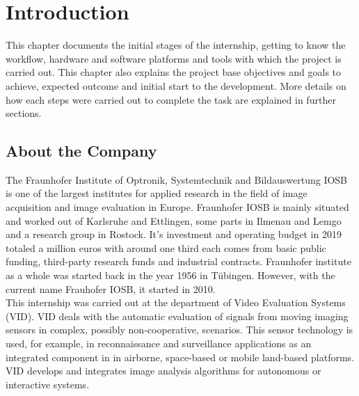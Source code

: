 \chapter{Introduction}
\label{ch:intro}
This chapter documents the initial stages of the internship, getting to know the workflow, hardware and software platforms and tools with which the project is carried out. This chapter also explains the project base objectives and goals to achieve, expected outcome and initial start to the development. More details on how each steps were carried out to complete the task are explained in further sections.

%
%
\section{About the Company}
\label{sec:intro:aboutthecompany}
The Fraunhofer Institute of Optronik, Systemtechnik and Bildauswertung IOSB is one of the largest institutes for applied research in the field of image acquisition and image evaluation in Europe. Fraunhofer IOSB is mainly situated and worked out of Karlsruhe and Ettlingen, some parts in Ilmenau and Lemgo and a research group in Rostock. It's investment and operating budget in 2019 totaled a million euros with around one third each comes from basic public funding, third-party research funds and industrial contracts. Fraunhofer institute as a whole was started back in the year 1956 in Tübingen. However, with the current name Frauhofer IOSB, it started in 2010.\\

This internship was carried out at the department of  Video Evaluation Systems (VID). VID deals with the automatic evaluation of signals from moving imaging sensors in complex, possibly non-cooperative, scenarios. This sensor technology is used, for example, in reconnaissance and surveillance applications as an integrated component in in airborne, space-based or mobile land-based platforms. VID develops and integrates image analysis algorithms for autonomous or interactive systems.

%
%
